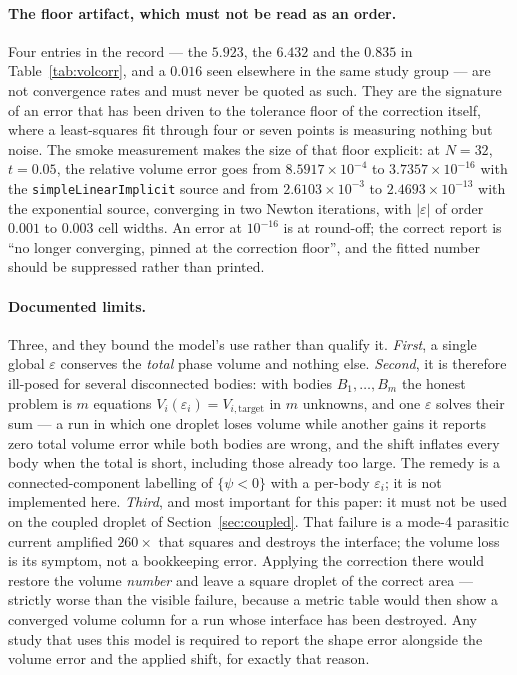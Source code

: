 \documentclass[preprint,3p,11pt]{elsarticle}
\newcommand{\psilev}{\psi}
\begin{document}
\paragraph{The floor artifact, which must not be read as an order.} Four entries in
the record --- the $5.923$, the $6.432$ and the $0.835$ in
Table~\ref{tab:volcorr}, and a $0.016$ seen elsewhere in the same study group ---
are not convergence rates and must never be quoted as such. They are the signature of an error that has been driven to the
tolerance floor of the correction itself, where a least-squares fit through four
or seven points is measuring nothing but noise. The smoke measurement makes the
size of that floor explicit: at $N=32$, $t=0.05$, the relative volume error goes
from $8.5917\times10^{-4}$ to $3.7357\times10^{-16}$ with the
\texttt{simpleLinearImplicit} source and from $2.6103\times10^{-3}$ to
$2.4693\times10^{-13}$ with the exponential source, converging in two Newton
iterations, with $|\varepsilon|$ of order $0.001$ to $0.003$ cell widths. An
error at $10^{-16}$ is at round-off; the correct report is ``no longer
converging, pinned at the correction floor'', and the fitted number should be
suppressed rather than printed.

\paragraph{Documented limits.} Three, and they bound the model's use rather than
qualify it. \emph{First}, a single global $\varepsilon$ conserves the
\emph{total} phase volume and nothing else. \emph{Second}, it is therefore
ill-posed for several disconnected bodies: with bodies $B_1,\dots,B_m$ the honest
problem is $m$ equations $V_i(\varepsilon_i) = V_{i,\text{target}}$ in $m$
unknowns, and one $\varepsilon$ solves their sum --- a run in which one droplet
loses volume while another gains it reports zero total volume error while both
bodies are wrong, and the shift inflates every body when the total is short,
including those already too large. The remedy is a connected-component labelling
of $\{\psilev<0\}$ with a per-body $\varepsilon_i$; it is not implemented here.
\emph{Third}, and most important for this paper: it must not be used on the
coupled droplet of Section~\ref{sec:coupled}. That failure is a mode-4 parasitic
current amplified $260\times$ that squares and destroys the interface; the volume
loss is its symptom, not a bookkeeping error. Applying the correction there would
restore the volume \emph{number} and leave a square droplet of the correct area
--- strictly worse than the visible failure, because a metric table would then
show a converged volume column for a run whose interface has been destroyed. Any
study that uses this model is required to report the shape error alongside the
volume error and the applied shift, for exactly that reason.
\end{document}
